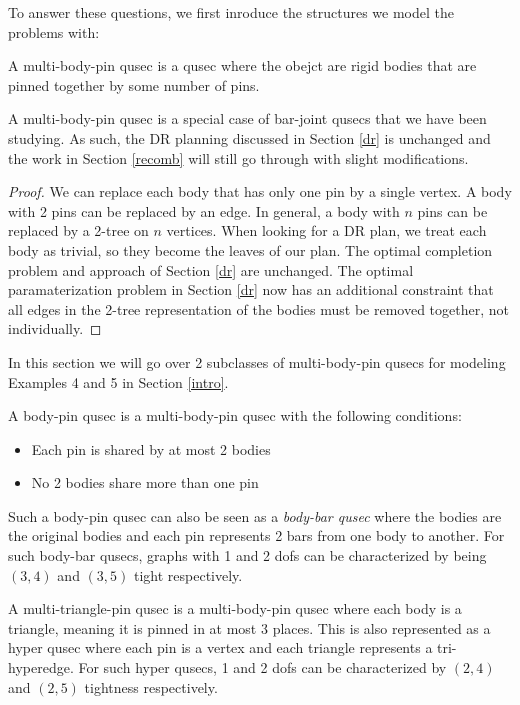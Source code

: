 To answer these questions, we first inroduce the structures we model the problems with:

\begin{definition}
    A multi-body-pin qusec is a qusec where the obejct are rigid bodies that are pinned together by some number of pins.
\end{definition}

\begin{remark}
    A multi-body-pin qusec is a special case of bar-joint qusecs that we have been studying. As such, the DR planning discussed in Section \ref{dr} is unchanged and the work in Section \ref{recomb} will still go through with slight modifications.
\end{remark}

\begin{proof}
    We can replace each body that has only one pin by a single vertex. A body with 2 pins can be replaced by an edge. In general, a body with $n$ pins can be replaced by a 2-tree on $n$ vertices. When looking for a DR plan, we treat each body as trivial, so they become the leaves of our plan. The optimal completion problem and approach of Section \ref{dr} are unchanged. The optimal paramaterization problem in Section \ref{dr} now has an additional constraint that all edges in the 2-tree representation of the bodies must be removed together, not individually.
\end{proof}

In this section we will go over 2 subclasses of multi-body-pin qusecs for modeling Examples 4 and 5 in Section \ref{intro}.

\begin{definition}
\label{def:body-pin}
    A body-pin qusec is a multi-body-pin qusec with the following conditions:
    \begin{itemize}
        \item Each pin is shared by at most 2 bodies
        \item No 2 bodies share more than one pin
    \end{itemize}
    Such a body-pin qusec can also be seen as a {\em body-bar qusec} where the bodies are the original bodies and each pin represents 2 bars from one body to another. For such body-bar qusecs, graphs with 1 and 2 dofs can be characterized by being $(3,4)$ and $(3,5)$ tight respectively.
\end{definition}

\begin{definition}
    A multi-triangle-pin qusec is a multi-body-pin qusec where each body is a triangle, meaning it is pinned in at most 3 places. This is also represented as a hyper qusec where each pin is a vertex and each triangle represents a tri-hyperedge. For such hyper qusecs, 1 and 2 dofs can be characterized by $(2,4)$ and $(2,5)$ tightness respectively.
\end{definition}

